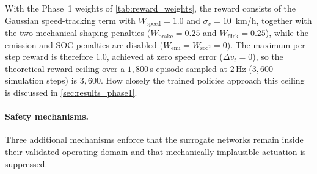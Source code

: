 With the Phase~1 weights of \autoref{tab:reward_weights}, the reward consists of the Gaussian speed-tracking term with $W_{\text{speed}} = 1.0$ and $\sigma_v = 10$~km/h, together with the two mechanical shaping penalties ($W_{\text{brake}} = 0.25$ and $W_{\text{flick}} = 0.25$), while the emission and \ac{SOC} penalties are disabled ($W_{\text{emi}} = W_{\text{soc}^2} = 0$). The maximum per-step reward is therefore $1.0$, achieved at zero speed error ($\Delta v_t = 0$), so the theoretical reward ceiling over a $1{,}800$\,s episode sampled at $2$\,Hz ($3{,}600$ simulation steps) is $3{,}600$. How closely the trained policies approach this ceiling is discussed in \autoref{sec:results_phase1}.

\paragraph{Safety mechanisms.}
Three additional mechanisms enforce that the surrogate networks remain inside their validated operating domain and that mechanically implausible actuation is suppressed.

